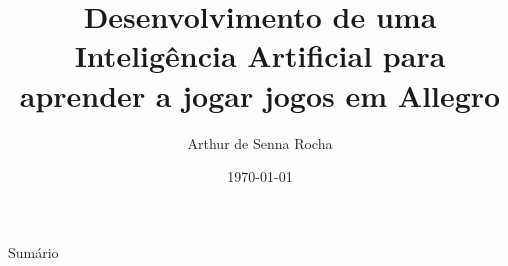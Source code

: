 \documentclass[aspectratio=169]{beamer}
\title{Desenvolvimento de uma Inteligência Artificial para aprender a jogar jogos em Allegro}
\author{Arthur de Senna Rocha}
\institute{}
\institute[VFU] %
{
  	Universidade Federal de Minas Gerais
	\par
	Escola de Engenharia
  \and
  Trabalho de Conclusão de Curso I
}
\date{\today}
\begin{document}
\begin{frame}


\titlepage

\end{frame}

\begin{frame}{Sumário}
\tableofcontents
\end{frame}

\end{document}
